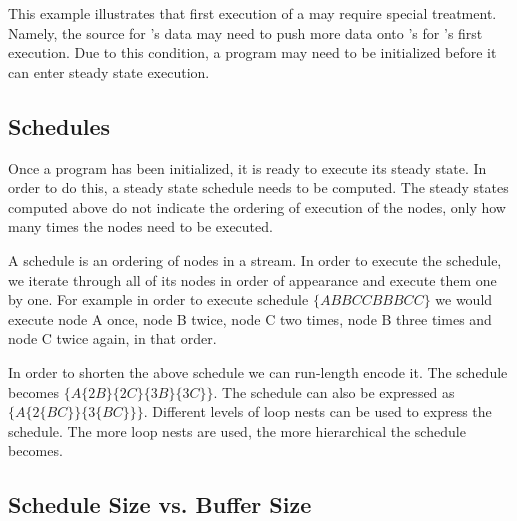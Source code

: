 This example illustrates that first execution of a {\filter} may
require special treatment.  Namely, the source for {\filter}'s data
may need to push more data onto {\filter}'s {\Input} {{\Channel}} for
{\filter}'s first execution.  Due to this condition, a {\StreamIt}
program may need to be initialized before it can enter steady
state execution.

\begin{comment}
There are other constraints (latency constraints) which may
require more complex initialization.  These will be discussed in
Chapter \ref{chpt:constrained}.

After an execution, a {\filter} $f$ must leave at least $e_f - o_f$
data on its {\Input} {{\Channel}}.  Thus, if the only constraints on
initialization are peek-related, it is a sufficient condition for
entering steady state schedule that $\forall f \in {\filters}, in_f
\ge e_f - o_f$.

Specific strategies for generating initialization schedules for
peeking will be presented in Chapter \ref{chpt:hierarchical} and
Chapter \ref{chpt:phased}.
\end{comment}

\subsection{Schedules}
\label{sec:general:schedules}

Once a program has been initialized, it is ready to execute its
steady state. In order to do this, a steady state schedule needs
to be computed. The steady states computed above do not indicate
the ordering of execution of the nodes, only how many times the
nodes need to be executed.

A schedule is an ordering of nodes in a {\StreamIt} stream. In
order to execute the schedule, we iterate through all of its nodes
in order of appearance and execute them one by one.  For example
in order to execute schedule $\{ABBCCBBBCC\}$ we would execute
node A once, node B twice, node C two times, node B three times
and node C twice again, in that order.

In order to shorten the above schedule we can run-length encode
it.  The schedule becomes $\{A \{2B\}\{2C\}\{3B\}\{3C\}\}$. The
schedule can also be expressed as $\{A \{2 \{BC\}\}\{3\{BC\}\}\}$.
Different levels of loop nests can be used to express the
schedule. The more loop nests are used, the more hierarchical the
schedule becomes.

\subsection{Schedule Size vs. Buffer Size}
\label{sec:sched-vs-buffer}


